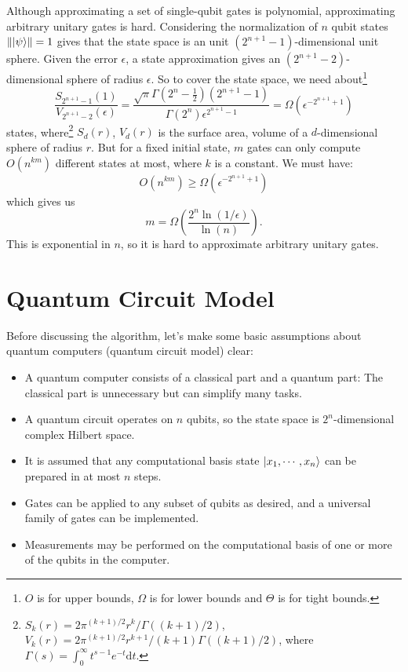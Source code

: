 \documentclass[a4paper,10pt]{book}
\numberwithin{equation}{section}
\begin{document}
Although approximating a set of single-qubit gates is polynomial, approximating arbitrary unitary gates is hard. Considering the normalization of $n$ qubit states $\left\|\ket{\psi}\right\|=1$ gives that the state space is an unit $(2^{n+1}-1)$-dimensional unit sphere. Given the error $\epsilon$, a state approximation gives an $(2^{n+1}-2)$-dimensional sphere of radius $\epsilon$. So to cover the state space, we need about\footnote{$O$ is for upper bounds, $\Omega$ is for lower bounds and $\Theta$ is for tight bounds. }
\begin{equation}
    \frac{S_{2^{n+1}-1}(1)}{V_{2^{n+1}-2}(\epsilon)} = \frac{\sqrt{\pi}\Gamma(2^{n}-\frac{1}{2})(2^{n+1}-1)}{\Gamma(2^{n})\epsilon^{2^{n+1}-1}}=\Omega(\epsilon^{-2^{n+1}+1})
\end{equation}
states, where\footnote{$S_{k}(r)=2\pi^{(k+1)/2}r^{k}/\Gamma((k+1)/2)$, $V_{k}(r)=2\pi^{(k+1)/2}r^{k+1}/(k+1)\Gamma((k+1)/2)$, where $\Gamma(s)=\int_{0}^{\infty}t^{s-1}e^{-t}\mathrm{d}t$.} $S_{d}(r)$, $V_{d}(r)$ is the surface area, volume of a $d$-dimensional sphere of radius $r$. But for a fixed initial state, $m$ gates can only compute $O(n^{km})$ different states at most, where $k$ is a constant. We must have:
\begin{equation}
    O(n^{km})\geq\Omega(\epsilon^{-2^{n+1}+1})
\end{equation}
which gives us
\begin{equation}
    m = \Omega\left(\frac{2^{n}\ln(1/\epsilon)}{\ln(n)}\right).
\end{equation}
This is exponential in $n$, so it is hard to approximate arbitrary unitary gates.



\section{Quantum Circuit Model}

Before discussing the algorithm, let's make some basic assumptions about quantum computers (quantum circuit model) clear:
\begin{itemize}
    \item A quantum computer consists of a classical part and a quantum part: The classical part is unnecessary but can simplify many tasks.
    \item A quantum circuit operates on $n$ qubits, so the state space is $2^{n}$-dimensional complex Hilbert space.
    \item It is assumed that any computational basis state $\ket{x_{1},\cdots,x_{n}}$ can be prepared in at most $n$ steps.
    \item Gates can be applied to any subset of qubits as desired, and a universal family of gates can be implemented.
    \item Measurements may be performed on the computational basis of one or more of the qubits in the computer.
\end{itemize}
\end{document}
